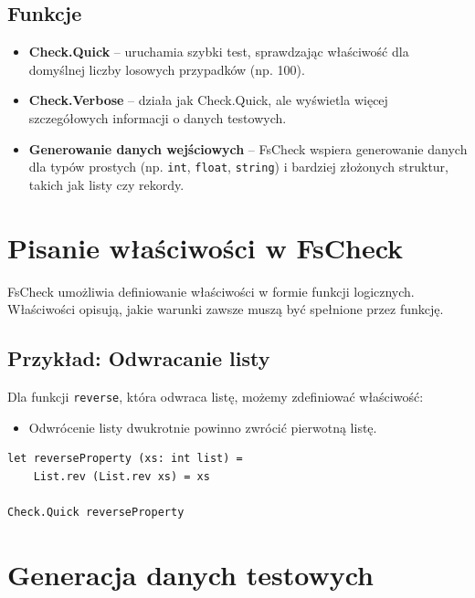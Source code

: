 \subsection*{Funkcje}
\begin{itemize}
    \item \textbf{Check.Quick} -- uruchamia szybki test, sprawdzając właściwość dla domyślnej liczby losowych przypadków (np. 100).
    \item \textbf{Check.Verbose} -- działa jak Check.Quick, ale wyświetla więcej szczegółowych informacji o danych testowych.
    \item \textbf{Generowanie danych wejściowych} -- FsCheck wspiera generowanie danych dla typów prostych (np. \texttt{int}, \texttt{float}, \texttt{string}) i bardziej złożonych struktur, takich jak listy czy rekordy.
\end{itemize}

\section*{Pisanie właściwości w FsCheck}

FsCheck umożliwia definiowanie właściwości w formie funkcji logicznych. Właściwości opisują, jakie warunki zawsze muszą być spełnione przez funkcję.

\subsection*{Przykład: Odwracanie listy}
Dla funkcji \texttt{reverse}, która odwraca listę, możemy zdefiniować właściwość:
\begin{itemize}
    \item Odwrócenie listy dwukrotnie powinno zwrócić pierwotną listę.
\end{itemize}

\lstset{language=FSharp, basicstyle=\scriptsize}
\begin{lstlisting}[frame=single,caption={Definicja właściwości dla odwracania listy},label=kod:listingA]
let reverseProperty (xs: int list) =
    List.rev (List.rev xs) = xs

Check.Quick reverseProperty
\end{lstlisting}

\section*{Generacja danych testowych}

